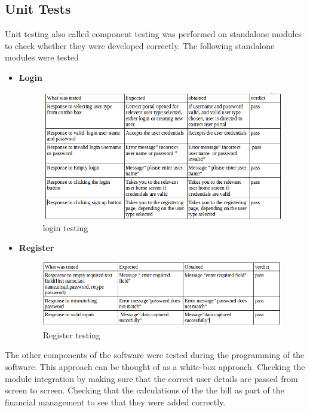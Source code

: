 \documentclass[11 pt]{article}
\begin{document}
\subsection{Unit Tests}
Unit testing also called component testing was performed on standalone modules to check whether they were developed correctly. The following standalone modules were tested
\begin{itemize}
\item \textbf{Login}
\begin{figure}[h]
\centering
\includegraphics[width=\linewidth]{Logins.png}
\caption{login testing}
\label{fig:ERD}
\end{figure}
\newpage
\item \textbf{Register}
\begin{figure}[h]
\centering
\includegraphics[width=\linewidth]{register.png}
\caption{Register testing}
\label{fig:ERD}
\end{figure}

\end{itemize}
The other components of the software were tested during the programming of the software. This approach can be thought of as a white-box approach. Checking the module integration by making sure that the correct user details are passed from screen to screen. Checking that the calculations of the the bill as part of the financial management to see that they were added correctly.
\end{document}
